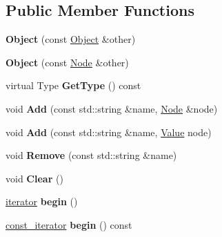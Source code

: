 \subsection*{Public Member Functions}
\begin{DoxyCompactItemize}
\item 
\hypertarget{class_jzon_1_1_object_adb1d5cf3f312c34bece55036e48f9f35}{{\bfseries Object} (const \hyperlink{class_jzon_1_1_object}{Object} \&other)}\label{class_jzon_1_1_object_adb1d5cf3f312c34bece55036e48f9f35}

\item 
\hypertarget{class_jzon_1_1_object_a37034187776cfae7c9be8e26b1c0be33}{{\bfseries Object} (const \hyperlink{class_jzon_1_1_node}{Node} \&other)}\label{class_jzon_1_1_object_a37034187776cfae7c9be8e26b1c0be33}

\item 
\hypertarget{class_jzon_1_1_object_abbce4e6637e62a3264896e8ecf3fdddc}{virtual Type {\bfseries Get\-Type} () const }\label{class_jzon_1_1_object_abbce4e6637e62a3264896e8ecf3fdddc}

\item 
\hypertarget{class_jzon_1_1_object_a62048e8fdb5348a7899bb9b2dfd7628c}{void {\bfseries Add} (const std\-::string \&name, \hyperlink{class_jzon_1_1_node}{Node} \&node)}\label{class_jzon_1_1_object_a62048e8fdb5348a7899bb9b2dfd7628c}

\item 
\hypertarget{class_jzon_1_1_object_af353b25b1d3c157c88c01595d8e5bca3}{void {\bfseries Add} (const std\-::string \&name, \hyperlink{class_jzon_1_1_value}{Value} node)}\label{class_jzon_1_1_object_af353b25b1d3c157c88c01595d8e5bca3}

\item 
\hypertarget{class_jzon_1_1_object_a8f28bd22e6e1db9d467f1be1f61a5832}{void {\bfseries Remove} (const std\-::string \&name)}\label{class_jzon_1_1_object_a8f28bd22e6e1db9d467f1be1f61a5832}

\item 
\hypertarget{class_jzon_1_1_object_a0a2ad1f23d5c49aaeff4f28fa17e143f}{void {\bfseries Clear} ()}\label{class_jzon_1_1_object_a0a2ad1f23d5c49aaeff4f28fa17e143f}

\item 
\hypertarget{class_jzon_1_1_object_a8019eb473c3c08bba82ba0569141fea7}{\hyperlink{class_jzon_1_1_object_1_1iterator}{iterator} {\bfseries begin} ()}\label{class_jzon_1_1_object_a8019eb473c3c08bba82ba0569141fea7}

\item 
\hypertarget{class_jzon_1_1_object_a8c58b2af4344c07a8b8048c0bc271838}{\hyperlink{class_jzon_1_1_object_1_1const__iterator}{const\-\_\-iterator} {\bfseries begin} () const }\label{class_jzon_1_1_object_a8c58b2af4344c07a8b8048c0bc271838}


\end{DoxyCompactItemize}
